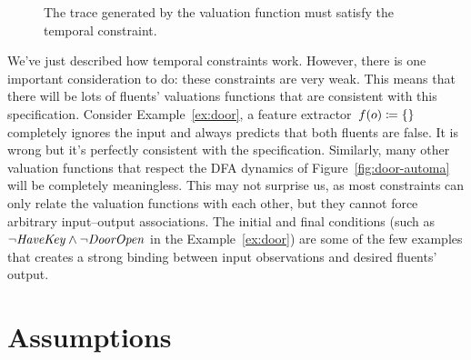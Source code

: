 \begin{figure}[bt]
	\caption{The trace generated by the valuation function must satisfy the
	temporal constraint.}
	\label{fig:constraints-scheme}
\end{figure}

We've just described how temporal constraints work. However, there is one
important consideration to do: these constraints are very weak. This means
that there will be lots of fluents' valuations functions that are consistent
with this specification. Consider Example~\ref{ex:door}, a feature
extractor~${f(o) \coloneqq \{\}}$ completely ignores the input and always
predicts that both fluents are false. It is wrong but it's perfectly
consistent with the specification. Similarly, many other valuation functions
that respect the DFA dynamics of Figure~\ref{fig:door-automa} will be
completely meaningless.  This may not surprise us, as most constraints can
only relate the valuation functions with each other, but they cannot force
arbitrary input--output associations. The initial and final conditions (such
as $\neg \text{\textit{HaveKey}} \land \neg \text{\textit{DoorOpen}}$ in the
Example~\ref{ex:door}) are some of the few examples that creates a strong
binding between input observations and desired fluents' output.


\section{Assumptions}

\label{sec:fluents-assumptions}

